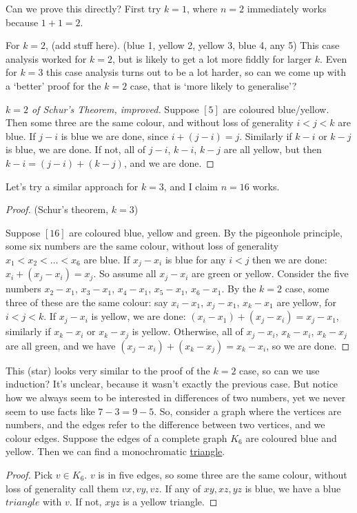 \documentclass{article}
\begin{document}
Can we prove this directly? First try $k=1$, where $n=2$ immediately works because $1+1=2$.

For $k=2$, (add stuff here). (blue 1, yellow 2, yellow 3, blue 4, any 5)
This case analysis worked for $k=2$, but is likely to get a lot more fiddly for larger $k$. Even for $k=3$ this case analysis turns out to be a lot harder, so can we come up with a `better' proof for the $k=2$ case, that is `more likely to generalise'?

\begin{proof}[$k=2$ of Schur's Theorem, improved]
    Suppose $[5]$ are coloured blue/yellow.  Then some three are the same colour, and without loss of generality $i < j < k$ are blue. If $j-i$ is blue we are done, since $i + (j-i) = j$.
    Similarly if $k-i$ or $k-j$ is blue, we are done.  If not, all of $j-i$, $k-i$, $k-j$ are all yellow, but then $k-i = (j-i) + (k-j)$, and we are done.
\end{proof}

Let's try a similar approach for $k=3$, and I claim $n=16$ works.

\begin{proof}(Schur's theorem, $k=3$)

    Suppose $[16]$ are coloured blue, yellow and green.  By the pigeonhole principle, some six numbers are the same colour, without loss of generality $x_1 < x_2 < \dots < x_6$ are blue.
    If $x_j - x_i$ is blue for any $i<j$ then we are done: $x_i + (x_j - x_i) = x_j$.  So assume all $x_j - x_i$ are green or yellow.
    Consider the five numbers $x_2 - x_1$, $x_3 - x_1$, $x_4 - x_1$, $x_5 - x_1$, $x_6 - x_1$.  By the $k=2$ case, some three of these are the same colour: say $x_i - x_1$, $x_j - x_1$, $x_k - x_1$ are yellow, for $i < j < k$.
    If $x_j - x_i$ is yellow, we are done: $(x_i - x_1) + (x_j - x_i) = x_j - x_1$, similarly if $x_k - x_i$ or $x_k - x_j$ is yellow.
    Otherwise, all of $x_j - x_i$, $x_k - x_i$, $x_k - x_j$ are all green, and we have $(x_j - x_i) + (x_k - x_j) = x_k - x_i$, so we are done.
\end{proof}

This (star) looks very similar to the proof of the $k=2$ case, so can we use induction? It's unclear, because it wasn't exactly the previous case.  But notice how we always seem to be interested in differences of two numbers, yet we never seem to use facts like $7-3 = 9-5$.
So, consider a graph where the vertices are numbers, and the edges refer to the difference between two vertices, and we colour edges.
Suppose the edges of a complete graph $K_6$ are coloured blue and yellow. Then we can find a monochromatic \hyperref[def:triangle]{triangle}.
\begin{proof}
    Pick $v \in K_6$. $v$ is in five edges, so some three are the same colour, without loss of generality call them $vx, vy, vz$. If any of $xy, xz, yz$ is blue, we have a blue $triangle$ with $v$. If not, $xyz$ is a yellow triangle.
\end{proof}
\end{document}

